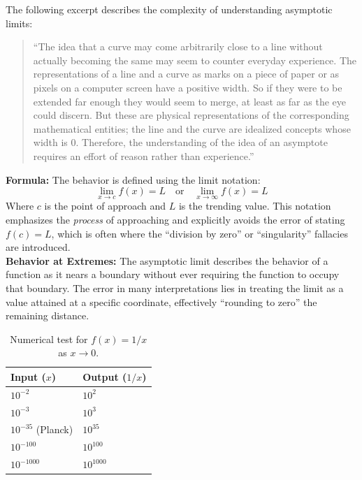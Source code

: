 \documentclass[twoside,twocolumn,9pt]{article}
\begin{document}
The following excerpt describes the complexity of understanding asymptotic limits:

\begin{quote}
``The idea that a curve may come arbitrarily close to a line without actually becoming the same may seem to counter everyday experience. The representations of a line and a curve as marks on a piece of paper or as pixels on a computer screen have a positive width. So if they were to be extended far enough they would seem to merge, at least as far as the eye could discern. But these are physical representations of the corresponding mathematical entities; the line and the curve are idealized concepts whose width is 0. Therefore, the understanding of the idea of an asymptote requires an effort of reason rather than experience.''\cite{wikipedia_asymptote}
\end{quote}

\noindent\textbf{Formula:}
The behavior is defined using the limit notation:
\begin{equation}
\lim_{x \to c} f(x) = L \quad \text{or} \quad \lim_{x \to \infty} f(x) = L
\end{equation}
Where $c$ is the point of approach and $L$ is the trending value. This notation emphasizes the \textit{process} of approaching and explicitly avoids the error of stating $f(c) = L$, which is often where the ``division by zero'' or ``singularity'' fallacies are introduced.\\

\noindent\textbf{Behavior at Extremes:}
The asymptotic limit describes the behavior of a function as it nears a boundary without ever requiring the function to occupy that boundary. The error in many interpretations lies in treating the limit as a value attained at a specific coordinate, effectively ``rounding to zero'' the remaining distance. 

\begin{table}[H]
\centering
\caption{Numerical test for $f(x) = 1/x$ as $x \to 0$.}
\begin{tabular}{ll}
\toprule
Input ($x$) & Output ($1/x$) \\
\midrule
$10^{-2}$ & $10^{2}$ \\
$10^{-3}$ & $10^{3}$ \\
$10^{-35}$ (Planck) & $10^{35}$ \\
$10^{-100}$ & $10^{100}$ \\
$10^{-1000}$ & $10^{1000}$ \\
\bottomrule
\end{tabular}
\end{table}
\end{document}
